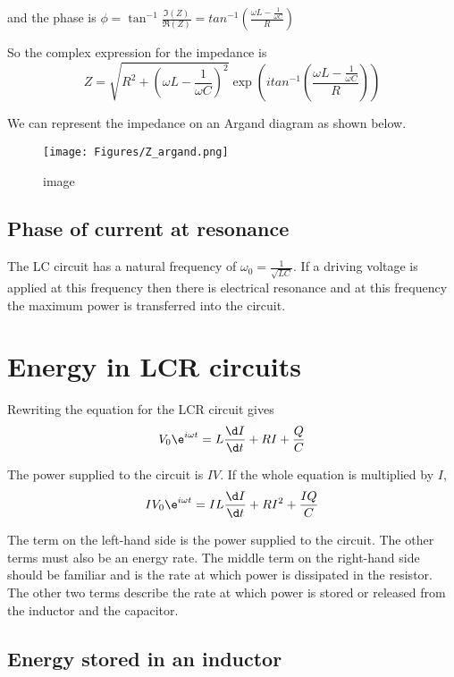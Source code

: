 \documentclass[
]{book}
\theoremstyle{definition}
\theoremstyle{definition}
\theoremstyle{definition}
\theoremstyle{definition}
\theoremstyle{remark}
\begin{document}
and the phase is
\(\phi = \tan^{-1}⁡ \frac{\Im(Z)}{ \Re(Z)}= tan^{-1}⁡\left( \frac{ \omega L - \frac{1}{\omega C} }{R} \right)\)

So the complex expression for the impedance is
\[Z = \sqrt{ R^2 + \left(\omega L - \frac{1}{\omega C} \right)^2 } \exp⁡ \left( i tan^{-1}⁡ \left( \frac{\omega L - \frac{1}{\omega C} }{R} \right)\right)\]

We can represent the impedance on an Argand diagram as shown below.

\begin{figure}
\centering
\texttt{[image: Figures/Z\_argand.png]}
\caption{image}
\end{figure}

\hypertarget{phase-of-current-at-resonance}{%
\subsection*{Phase of current at resonance}\label{phase-of-current-at-resonance}}

The LC circuit has a natural frequency of
\(\omega_0 = \frac{1}{\sqrt{LC}}\). If a driving voltage is applied at
this frequency then there is electrical resonance and at this frequency
the maximum power is transferred into the circuit.

\hypertarget{energy-in-lcr-circuits}{%
\section{Energy in LCR circuits}\label{energy-in-lcr-circuits}}

Rewriting the equation for the LCR circuit gives
\[V_0 \e^{i\omega t} = L \frac{\d I}{\d t} + RI + \frac{Q}{C}\]

The power supplied to the circuit is \(IV\). If the whole equation is
multiplied by \(I\),
\[I V_0 \e^{i\omega t} = IL \frac{\d I}{\d t} + RI^2 + \frac{IQ}{C}\]

The term on the left-hand side is the power supplied to the circuit. The
other terms must also be an energy rate. The middle term on the
right-hand side should be familiar and is the rate at which power is
dissipated in the resistor. The other two terms describe the rate at
which power is stored or released from the inductor and the capacitor.

\hypertarget{energy-stored-in-an-inductor}{%
\subsection{Energy stored in an inductor}\label{energy-stored-in-an-inductor}}
\end{document}
